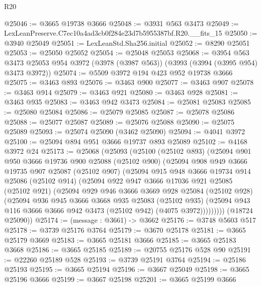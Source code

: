 \begin{lexlean}{R20}
\begin{coremodule}
@25046 := @3665 @19738 @3666
@25048 := @3931 @563 @3473
@25049 := LexLeanPreserve.C7ec10a4ad3cb0f284e23d7b5955387bf.R20.__fits_15
@25050 := @3940 @25049
@25051 := LexLeanStd.Sha256.initial
@25052 := @8290 @25051
@25053 := @25050 @25052
@25054 := @25048 @25053
@25068 := @3954
    @563
    @3473
    @25053
    @954
    @3972
    (@3978 (@3987 @563))
    (@3993 (@3994 (@3995 @954) @3473 @3972))
@25074 := @5509 @3972 @194 @423 @952 @19738 @3666
@25075 := @3463 @893
@25076 := @3463 @900
@25077 := @3463 @907
@25078 := @3463 @914
@25079 := @3463 @921
@25080 := @3463 @928
@25081 := @3463 @935
@25083 := @3463 @942 @3473
@25084 := @25081 @25083
@25085 := @25080 @25084
@25086 := @25079 @25085
@25087 := @25078 @25086
@25088 := @25077 @25087
@25089 := @25076 @25088
@25090 := @25075 @25089
@25093 := @25074 @25090 (@3462 @25090)
@25094 := @4041 @3972
@25100 := @25094 @894 @951 @3666 @19737 @893 @25089
@25102 := @4168 @3972 @24
@25173 := @25068
    (@25093
      (@25100
        (@25102 @893)
        (@25094
          @901
          @950
          @3666
          @19736
          @900
          @25088
          (@25102 @900)
          (@25094
            @908
            @949
            @3666
            @19735
            @907
            @25087
            (@25102 @907)
            (@25094
              @915
              @948
              @3666
              @19734
              @914
              @25086
              (@25102 @914)
              (@25094
                @922
                @947
                @3666
                @17036
                @921
                @25085
                (@25102 @921)
                (@25094
                  @929
                  @946
                  @3666
                  @3669
                  @928
                  @25084
                  (@25102 @928)
                  (@25094
                    @936
                    @945
                    @3666
                    @3668
                    @935
                    @25083
                    (@25102 @935)
                    (@25094 @943 @116 @3666 @3666 @942 @3473 (@25102 @942) (@4075 @3972)))))))))
      (@18724 @25090))
@25174 := (message : @3661) -> @3662
@25176 := @3748 @5603 @517
@25178 := @3739 @25176 @3764
@25179 := @3670 @25178
@25181 := @3665 @25179 @3669
@25183 := @3665 @25181 @3666
@25185 := @3665 @25183 @3668
@25186 := @3665 @25185
@25189 := @20755 @25176 @528 @90
@25191 := @22260 @25189 @528
@25193 := @3739 @25191 @3764
@25194 := @25186 @25193
@25195 := @3665 @25194
@25196 := @3667 @25049
@25198 := @3665 @25196 @3666
@25199 := @3667 @25198
@25201 := @3665 @25199 @3666

\end{coremodule}
\end{lexlean}
